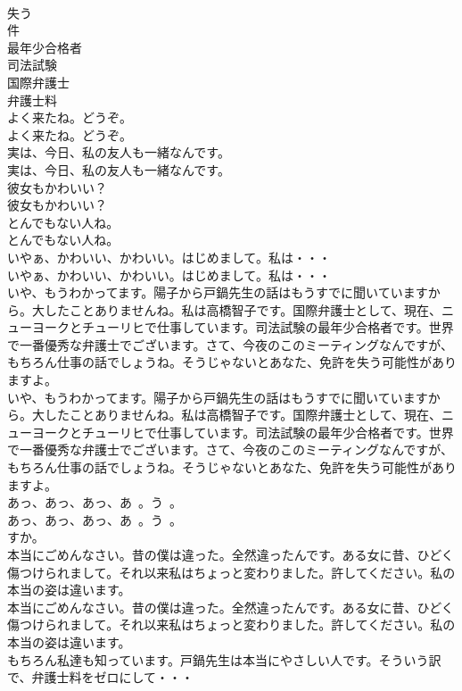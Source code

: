 \documentclass[8pt]{extreport}
\begin{document}
\begin{CJK}{UTF8}{min}
\\	失う
\\	件
\\	最年少合格者
\\	司法試験
\\	国際弁護士
\\	弁護士料
\\	よく来たね。どうぞ。	
\\	よく来たね。どうぞ。 
\\	実は、今日、私の友人も一緒なんです。	
\\	実は、今日、私の友人も一緒なんです。 
\\	彼女もかわいい？	
\\	彼女もかわいい？ 
\\	とんでもない人ね。	
\\	とんでもない人ね。 
\\	いやぁ、かわいい、かわいい。はじめまして。私は・・・	
\\	いやぁ、かわいい、かわいい。はじめまして。私は・・・ 
\\	いや、もうわかってます。陽子から戸鍋先生の話はもうすでに聞いていますから。大したことありませんね。私は高橋智子です。国際弁護士として、現在、ニューヨークとチューリヒで仕事しています。司法試験の最年少合格者です。世界で一番優秀な弁護士でございます。さて、今夜のこのミーティングなんですが、もちろん仕事の話でしょうね。そうじゃないとあなた、免許を失う可能性がありますよ。	
\\	いや、もうわかってます。陽子から戸鍋先生の話はもうすでに聞いていますから。大したことありませんね。私は高橋智子です。国際弁護士として、現在、ニューヨークとチューリヒで仕事しています。司法試験の最年少合格者です。世界で一番優秀な弁護士でございます。さて、今夜のこのミーティングなんですが、もちろん仕事の話でしょうね。そうじゃないとあなた、免許を失う可能性がありますよ。 
\\	あっ、あっ、あっ、あ~。う~。	
\\	あっ、あっ、あっ、あ~。う~。 
\\	すか。	
\\	本当にごめんなさい。昔の僕は違った。全然違ったんです。ある女に昔、ひどく傷つけられまして。それ以来私はちょっと変わりました。許してください。私の本当の姿は違います。	
\\	本当にごめんなさい。昔の僕は違った。全然違ったんです。ある女に昔、ひどく傷つけられまして。それ以来私はちょっと変わりました。許してください。私の本当の姿は違います。 
\\	もちろん私達も知っています。戸鍋先生は本当にやさしい人です。そういう訳で、弁護士料をゼロにして・・・	

\end{CJK}
\end{document}
